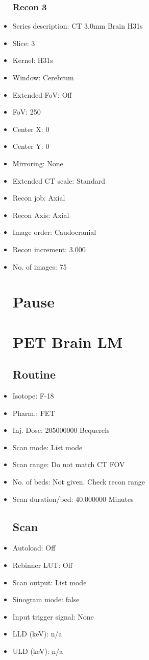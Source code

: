 \documentclass[12pt]{article}
\begin{document}
\begin{itemize}[noitemsep]
\subsubsection{Recon 3}
\item Series description: CT 3.0mm  Brain H31s
\item Slice: 3
\item Kernel: H31s
\item Window: Cerebrum
\item Extended FoV: Off
\item FoV: 250
\item Center X: 0
\item Center Y: 0
\item Mirroring: None
\item Extended CT scale: Standard
\item Recon job: Axial
\item Recon Axis: Axial
\item Image order: Caudocranial
\item Recon increment: 3.000
\item No. of images: 75
\section{Pause}
\section{PET Brain LM}\subsection{Routine}
\item Isotope: F-18
\item Pharm.: FET
\item Inj. Dose: 205000000 Bequerels
\item Scan mode: List mode
\item Scan range: Do not match CT FOV
\item No. of beds: Not given. Check recon range
\item Scan duration/bed: 40.000000 Minutes
\subsection{Scan}
\item Autoload: Off
\item Rebinner LUT: Off
\item Scan output: List mode
\item Sinogram mode: false
\item Input trigger signal: None
\item LLD (keV): n/a
\item ULD (keV): n/a

\end{itemize}
\end{document}
